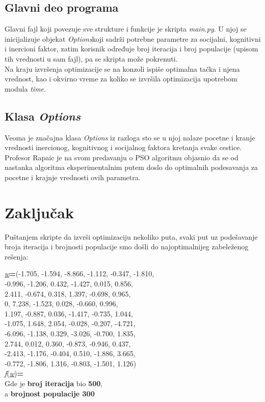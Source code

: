 \documentclass[12pt, a4paper]{article}
\newcommand{\vecw}{\underline{\textit{w}}}
\newcommand{\fw}{\textit{f}(\vecw)}
\begin{document}
    \subsection{Glavni deo programa}
        Glavni fajl koji povezuje sve strukture i funkcije je skripta \textit{main.py}. U njoj se inicijalizuje objekat \textit{Options}\space koji sadrži potrebne parametre za socijalni, kognitivni i inercioni faktor, zatim korisnik određuje broj iteracija i broj populacije (upisom tih vrednosti u sam fajl), pa se skripta može pokrenuti.\\
        Na kraju izvršenja optimizacije se na konzoli ispiše optimalna tačka i njena vrednost, kao i okvirno vreme za koliko se izvršila optimizacija upotrebom modula \textit{time}.
        
    \subsection{Klasa \textit{Options}}
    Veoma je značajna klasa \textit{Options} iz razloga sto se u njoj nalaze pocetne i
    kranje vrednosti inercionog, kognitivnog i socijalnog faktora kretanja svake cestice.
    Profesor Rapaic je na svom predavanju o PSO algoritmu objasnio da se od nastanka algoritma eksperimentalnim putem doslo do optimalnih podesavanja za pocetne i krajnje vrednosti ovih parametra.
    

    
    \section{Zaključak}
    Puštanjem skripte da izvrši optimizaciju nekoliko puta, svaki put uz podešavanje broja iteracija i brojnosti populacije smo došli do najoptimalnijeg zabeleženog rešenja:\\

    \newpage
    \begin{center}
       \vecw\space \textbf{=}\space (-1.705, -1.594, -8.866, -1.112, -0.347, -1.810,\\
        -0.996, -1.206, 0.432, -1.427, 0.015, 0.856,\\
        2.411, -0.674, 0.318, 1.397, -0.698, 0.965,\\
        0, 7.238, -1.523, 0.028, -0.660, 0.996,\\
        1.197, -0.887, 0.036, -1.417, -0.735, 1.044,\\
        -1.075, 1.648, 2.054, -0.028, -0.207, -4.721,\\
        -6.096, -1.138, 0.329, -3.026, -0.700, 1.835,\\
        2.744, 0.012, 0.360, -0.873, -0.946, 0.437,\\
        -2.413, -1.176, -0.404, 0.510, -1.886, 3.665,\\
        -0.772, -1.806, 1.316, -0.803, -1.501, 1.126)\\
        \fw \textbf{=}\\ 
        Gde je \textbf{broj iteracija} bio \textbf{500},\\
        a \textbf{brojnost populacije 300}\\
    \end{center}
    
\end{document}
